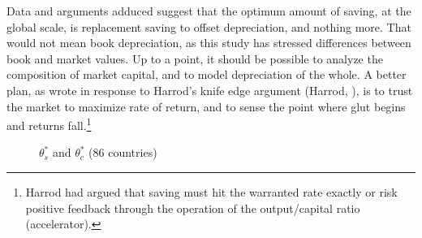 \documentclass[a4paper,fleqn]{latex_styles/cas-sc}
\begin{document}
Data and arguments adduced suggest that the optimum amount of
saving, at the global scale, is replacement saving to offset depreciation, and nothing
more. That would not mean book depreciation, as this study has stressed
differences between book and market values. Up to a point, it should be
possible to analyze the composition of market capital, and to model
depreciation of the whole. A better plan, as
\citet{solowContributionTheoryEconomic1956a} wrote in response to
Harrod's knife edge argument (Harrod, \citeyear{harrodEssayDynamicTheory1939}), is to
trust the market to maximize rate of return, and to sense the point
where glut begins and returns fall.\footnote{Harrod had argued that
saving must hit the warranted rate exactly or risk positive
feedback through the operation of the output/capital ratio
(accelerator).}
%
\FloatBarrier
\begin{figure}[pos=H]
    \centering
    \quad %
    \captionsetup{justification=centering}
    \caption{\(\theta^*_{s}\) and \(\theta^*_c\) (86 countries)}
    \label{fig-s_c_theta_plots}
\end{figure}
\end{document}
